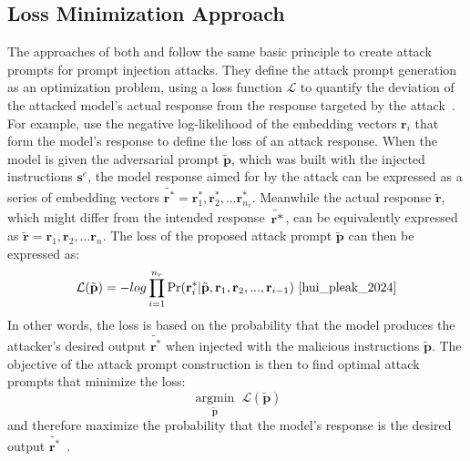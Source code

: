 \subsection{Loss Minimization Approach} \label{sec:loss_minimization}
The approaches of both \hui and \shi follow the same basic principle to create attack prompts for prompt injection attacks.
They define the attack prompt generation as an optimization problem, using a loss function $\mathcal{L}$ to quantify the deviation of the attacked model's actual response from the response targeted by the attack~\cite{hui_pleak_2024, shi_optimization-based_2024}.
For example, \shi use the negative log-likelihood of the embedding vectors $\textbf{r}_i$ that form the model's response to define the loss of an attack response.
When the model is given the adversarial prompt $\tilde{\textbf{p}}$, which was built with the injected instructions $\textbf{s}^e$, the model response aimed for by the attack can be expressed as a series of embedding vectors $\tilde{\textbf{r}^*} = \textbf{r}_1^*, \textbf{r}_2^*, ... \textbf{r}_{n_r}^*$.
Meanwhile the actual response $\tilde{\textbf{r}}$, which might differ from the intended response $\tilde{\textbf{r}*}$, can be equivalently expressed as $\tilde{\textbf{r}} = \textbf{r}_1, \textbf{r}_2, ... \textbf{r}_n$.
The loss of the proposed attack prompt $\tilde{\textbf{p}}$ can then be expressed as:
\begin{equation}
    \mathcal{L}(\tilde{\textbf{p}}) = -log \prod_{i=1}^{n_r} \text{Pr}(\textbf{r}_i^*|\tilde{\textbf{p}}, \textbf{r}_1, \textbf{r}_2, ..., \textbf{r}_{i-1})~\cite{hui_pleak_2024}
    \label{eq:optimization_loss}
\end{equation}
In other words, the loss is based on the probability that the model produces the attacker's desired output $\tilde{\textbf{r}^*}$ when injected with the malicious instructions $\tilde{\textbf{p}}$.
The objective of the attack prompt construction is then to find optimal attack prompts that minimize the loss:
\begin{equation}
    \underset{\tilde{\textbf{p}}}{\operatorname{argmin}} \; \mathcal{L}(\tilde{\textbf{p}})
\end{equation}
and therefore maximize the probability that the model's response is the desired output $\tilde{\textbf{r}^*}$~\cite{hui_pleak_2024, shi_optimization-based_2024}.\\

